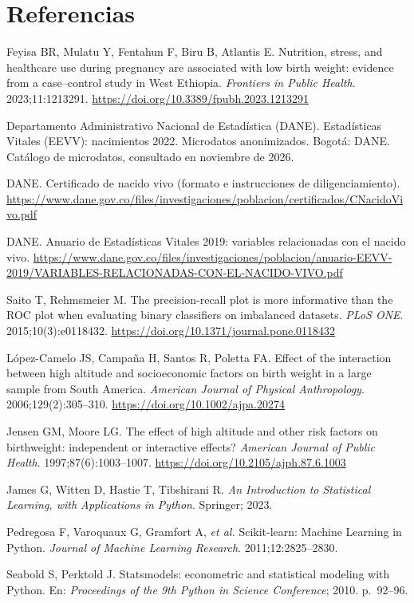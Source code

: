 \documentclass[11pt,a4paper]{article}
\begin{document}
\section*{Referencias}
\small
\begin{enumerate}[label={[\arabic*]},leftmargin=2em]
\item Feyisa BR, Mulatu Y, Fentahun F, Biru B, Atlantis E. Nutrition, stress, and healthcare use during pregnancy are associated with low birth weight: evidence from a case--control study in West Ethiopia. \emph{Frontiers in Public Health}. 2023;11:1213291. \url{https://doi.org/10.3389/fpubh.2023.1213291}
\item Departamento Administrativo Nacional de Estadística (DANE). Estadísticas Vitales (EEVV): nacimientos 2022. Microdatos anonimizados. Bogotá: DANE. Catálogo de microdatos, consultado en noviembre de 2026.
\item DANE. Certificado de nacido vivo (formato e instrucciones de diligenciamiento). \url{https://www.dane.gov.co/files/investigaciones/poblacion/certificados/CNacidoVivo.pdf}
\item DANE. Anuario de Estadísticas Vitales 2019: variables relacionadas con el nacido vivo. \url{https://www.dane.gov.co/files/investigaciones/poblacion/anuario-EEVV-2019/VARIABLES-RELACIONADAS-CON-EL-NACIDO-VIVO.pdf}
\item Saito T, Rehmsmeier M. The precision-recall plot is more informative than the ROC plot when evaluating binary classifiers on imbalanced datasets. \emph{PLoS ONE}. 2015;10(3):e0118432. \url{https://doi.org/10.1371/journal.pone.0118432}
\item López-Camelo JS, Campaña H, Santos R, Poletta FA. Effect of the interaction between high altitude and socioeconomic factors on birth weight in a large sample from South America. \emph{American Journal of Physical Anthropology}. 2006;129(2):305--310. \url{https://doi.org/10.1002/ajpa.20274}
\item Jensen GM, Moore LG. The effect of high altitude and other risk factors on birthweight: independent or interactive effects? \emph{American Journal of Public Health}. 1997;87(6):1003--1007. \url{https://doi.org/10.2105/ajph.87.6.1003}
\item James G, Witten D, Hastie T, Tibshirani R. \emph{An Introduction to Statistical Learning, with Applications in Python}. Springer; 2023.
\item Pedregosa F, Varoquaux G, Gramfort A, \emph{et al.} Scikit-learn: Machine Learning in Python. \emph{Journal of Machine Learning Research}. 2011;12:2825--2830.
\item Seabold S, Perktold J. Statsmodels: econometric and statistical modeling with Python. En: \emph{Proceedings of the 9th Python in Science Conference}; 2010. p.~92--96.
\end{enumerate}
\end{document}
